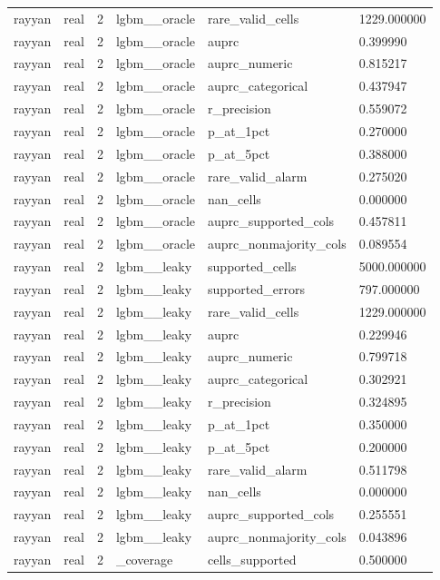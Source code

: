 \begin{tabular}{llllll}
rayyan & real & 2 & lgbm\_\_oracle & rare\_valid\_cells & 1229.000000 \\
rayyan & real & 2 & lgbm\_\_oracle & auprc & 0.399990 \\
rayyan & real & 2 & lgbm\_\_oracle & auprc\_numeric & 0.815217 \\
rayyan & real & 2 & lgbm\_\_oracle & auprc\_categorical & 0.437947 \\
rayyan & real & 2 & lgbm\_\_oracle & r\_precision & 0.559072 \\
rayyan & real & 2 & lgbm\_\_oracle & p\_at\_1pct & 0.270000 \\
rayyan & real & 2 & lgbm\_\_oracle & p\_at\_5pct & 0.388000 \\
rayyan & real & 2 & lgbm\_\_oracle & rare\_valid\_alarm & 0.275020 \\
rayyan & real & 2 & lgbm\_\_oracle & nan\_cells & 0.000000 \\
rayyan & real & 2 & lgbm\_\_oracle & auprc\_supported\_cols & 0.457811 \\
rayyan & real & 2 & lgbm\_\_oracle & auprc\_nonmajority\_cols & 0.089554 \\
rayyan & real & 2 & lgbm\_\_leaky & supported\_cells & 5000.000000 \\
rayyan & real & 2 & lgbm\_\_leaky & supported\_errors & 797.000000 \\
rayyan & real & 2 & lgbm\_\_leaky & rare\_valid\_cells & 1229.000000 \\
rayyan & real & 2 & lgbm\_\_leaky & auprc & 0.229946 \\
rayyan & real & 2 & lgbm\_\_leaky & auprc\_numeric & 0.799718 \\
rayyan & real & 2 & lgbm\_\_leaky & auprc\_categorical & 0.302921 \\
rayyan & real & 2 & lgbm\_\_leaky & r\_precision & 0.324895 \\
rayyan & real & 2 & lgbm\_\_leaky & p\_at\_1pct & 0.350000 \\
rayyan & real & 2 & lgbm\_\_leaky & p\_at\_5pct & 0.200000 \\
rayyan & real & 2 & lgbm\_\_leaky & rare\_valid\_alarm & 0.511798 \\
rayyan & real & 2 & lgbm\_\_leaky & nan\_cells & 0.000000 \\
rayyan & real & 2 & lgbm\_\_leaky & auprc\_supported\_cols & 0.255551 \\
rayyan & real & 2 & lgbm\_\_leaky & auprc\_nonmajority\_cols & 0.043896 \\
rayyan & real & 2 & \_coverage & cells\_supported & 0.500000 \\

\end{tabular}
